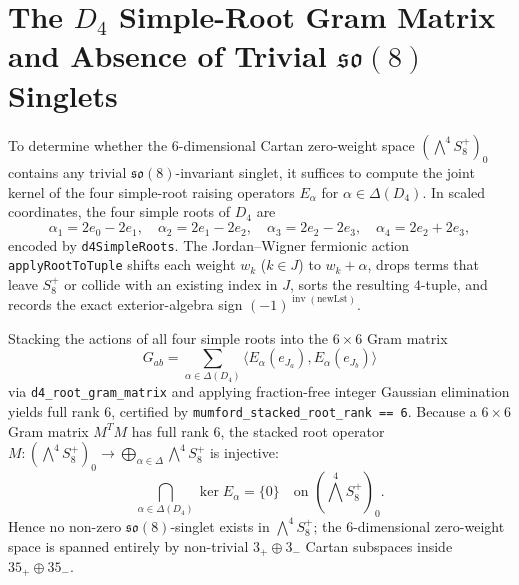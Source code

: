 \documentclass[11pt,a4paper]{article}
\begin{document}
\section{The \texorpdfstring{$D_4$}{D4} Simple-Root Gram Matrix and Absence of Trivial \texorpdfstring{$\mathfrak{so}(8)$}{so(8)} Singlets}

To determine whether the $6$-dimensional Cartan zero-weight space $(\bigwedge^4 S^+_8)_0$ contains any trivial $\mathfrak{so}(8)$-invariant singlet, it suffices to compute the joint kernel of the four simple-root raising operators $E_\alpha$ for $\alpha \in \Delta(D_4)$. In scaled coordinates, the four simple roots of $D_4$ are
\begin{equation}
  \alpha_1 = 2e_0 - 2e_1, \quad \alpha_2 = 2e_1 - 2e_2, \quad \alpha_3 = 2e_2 - 2e_3, \quad \alpha_4 = 2e_2 + 2e_3,
\end{equation}
encoded by \texttt{d4SimpleRoots}. The Jordan--Wigner fermionic action \texttt{applyRootToTuple} shifts each weight $w_k$ ($k \in J$) to $w_k + \alpha$, drops terms that leave $S^+_8$ or collide with an existing index in $J$, sorts the resulting $4$-tuple, and records the exact exterior-algebra sign $(-1)^{\operatorname{inv}(\text{newLst})}$.

Stacking the actions of all four simple roots into the $6 \times 6$ Gram matrix
\begin{equation}
  G_{ab} = \sum_{\alpha \in \Delta(D_4)} \langle E_\alpha(e_{J_a}), E_\alpha(e_{J_b}) \rangle
\end{equation}
via \texttt{d4\_root\_gram\_matrix} and applying fraction-free integer Gaussian elimination yields full rank $6$, certified by \texttt{mumford\_stacked\_root\_rank == 6}. Because a $6 \times 6$ Gram matrix $M^T M$ has full rank $6$, the stacked root operator $M : (\bigwedge^4 S^+_8)_0 \to \bigoplus_{\alpha \in \Delta} \bigwedge^4 S^+_8$ is injective:
\begin{equation}
  \bigcap_{\alpha \in \Delta(D_4)} \ker E_\alpha = \{0\} \quad \text{on } \left(\bigwedge^4 S^+_8\right)_0.
\end{equation}
Hence no non-zero $\mathfrak{so}(8)$-singlet exists in $\bigwedge^4 S^+_8$; the $6$-dimensional zero-weight space is spanned entirely by non-trivial $3_+ \oplus 3_-$ Cartan subspaces inside $35_+ \oplus 35_-$.
\end{document}
